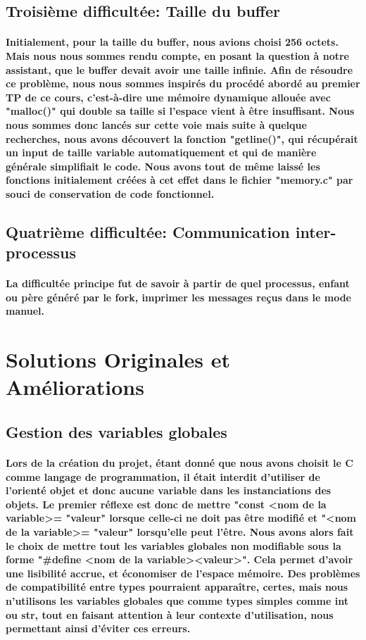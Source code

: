 \documentclass[utf8]{article}
\begin{document}
\subsection{Troisième difficultée: Taille du buffer}
\paragraph{Initialement, pour la taille du buffer, nous avions choisi 256 octets. Mais
nous nous sommes rendu compte, en posant la question à notre assistant, que le buffer devait avoir une taille infinie. Afin 
de résoudre ce problème, nous nous sommes inspirés du procédé abordé au premier TP de ce cours, c'est-à-dire une mémoire dynamique
allouée avec "malloc()" qui double sa taille si l'espace vient à être insuffisant. Nous nous sommes donc lancés sur cette voie mais suite
à quelque recherches, nous avons découvert la fonction "getline()", qui récupérait un input de taille variable automatiquement et qui de manière
générale simplifiait le code. Nous avons tout de même laissé les fonctions initialement créées à cet effet dans le fichier "memory.c" par souci de
conservation de code fonctionnel.}

\subsection{Quatrième difficultée: Communication inter-processus}
\paragraph{ La difficultée principe fut de savoir à partir de quel processus, enfant ou père généré par le fork, imprimer les messages reçus dans le mode manuel.}


\section{Solutions Originales et Améliorations}
\subsection{Gestion des variables globales}
\paragraph{Lors de la création du projet, étant donné que nous avons choisit le C comme langage de programmation, il était interdit 
d'utiliser de l'orienté objet et donc aucune variable dans les instanciations des objets. Le premier réflexe est donc de mettre
"const \textless nom de la variable\textgreater  = "valeur" lorsque celle-ci ne doit pas être modifié et "\textless nom de la variable\textgreater = "valeur" lorsqu'elle 
peut l'être. Nous avons alors fait le choix de mettre tout les variables globales non modifiable sous la forme 
"\#define \textless nom de la variable\textgreater \textless valeur\textgreater". Cela permet d'avoir une lisibilité accrue, et économiser de l'espace mémoire. Des
problèmes de compatibilité entre types pourraient apparaître, certes, mais nous n'utilisons les variables globales que comme types simples comme int ou str, tout en
faisant attention à leur contexte d'utilisation, nous permettant ainsi d'éviter ces erreurs.}
\end{document}
